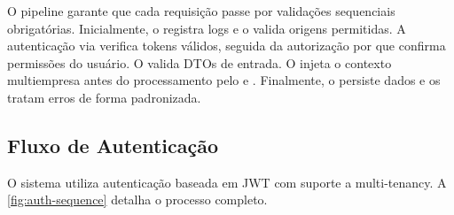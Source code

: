 O pipeline garante que cada requisição passe por validações sequenciais obrigatórias. Inicialmente, o  registra logs e o  valida origens permitidas. A autenticação via  verifica tokens válidos, seguida da autorização por  que confirma permissões do usuário. O  valida DTOs de entrada. O  injeta o contexto multiempresa antes do processamento pelo  e . Finalmente, o  persiste dados e os  tratam erros de forma padronizada.

\subsection{Fluxo de Autenticação}

O sistema utiliza autenticação baseada em JWT com suporte a multi-tenancy. A \autoref{fig:auth-sequence} detalha o processo completo.

